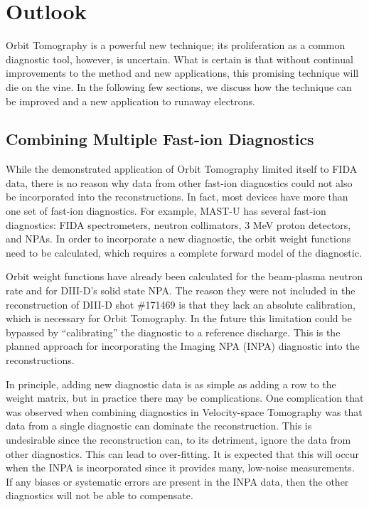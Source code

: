\chapter{Outlook}\label{chap:outlook}

Orbit Tomography is a powerful new technique; its proliferation as a common diagnostic tool, however, is uncertain. What is certain is that without continual improvements to the method and new applications, this promising technique will die on the vine. In the following few sections, we discuss how the technique can be improved and a new application to runaway electrons.

\section{Combining Multiple Fast-ion Diagnostics}
While the demonstrated application of Orbit Tomography limited itself to FIDA data, there is no reason why data from other fast-ion diagnostics could not also be incorporated into the reconstructions. In fact, most devices have more than one set of fast-ion diagnostics. For example, MAST-U has several fast-ion diagnostics: FIDA spectrometers, neutron collimators, 3 MeV proton detectors, and NPAs. In order to incorporate a new diagnostic, the orbit weight functions need to be calculated, which requires a complete forward model of the diagnostic.

Orbit weight functions have already been calculated for the beam-plasma neutron rate and for DIII-D's solid state NPA. The reason they were not included in the reconstruction of DIII-D shot \#171469 is that they lack an absolute calibration, which is necessary for Orbit Tomography. In the future this limitation could be bypassed by ``calibrating'' the diagnostic to a reference discharge. This is the planned approach for incorporating the Imaging NPA (INPA) diagnostic into the reconstructions.

In principle, adding new diagnostic data is as simple as adding a row to the weight matrix, but in practice there may be complications. One complication that was observed when combining diagnostics in Velocity-space Tomography\cite{salewski2012,salewski2013_tomography,salewski2017mev,salewski2018bayesian} was that data from a single diagnostic can dominate the reconstruction. This is undesirable since the reconstruction can, to its detriment, ignore the data from other diagnostics. This can lead to over-fitting. It is expected that this will occur when the INPA is incorporated since it provides many, low-noise measurements. If any biases or systematic errors are present in the INPA data, then the other diagnostics will not be able to compensate.

